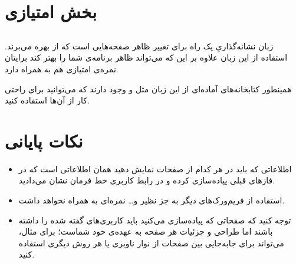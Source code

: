 \documentclass{utap}
\begin{document}
    
    
    
    
    
    \section{بخش امتیازی}
        \subsection{}
    زبان نشانه‌گذاریِ 
 یک راه برای تغییر ظاهر صفحه‌هایی است که از  بهره می‌برند. استفاده از این زبان علاوه بر این که می‌تواند ظاهر برنامه‌ی شما را بهتر کند برایتان نمره‌ی امتیازی هم به همراه دارد.
 
 همینطور کتابخانه‌های آماده‌ای از این زبان مثل
  و
  وجود دارند که می‌توانید برای راحتی کار از آن‌ها استفاده کنید. 
 
 
 
 
    \section{نکات پایانی}
        \begin{itemize}
            \item  اطلاعاتی که باید در هر کدام از صفحات نمایش دهید همان اطلاعاتی است که در فاز‌های قبلی پیاده‌سازی کرده‌ و در رابط کاربری خط فرمان نشان می‌دادید. 
            \item  
            استفاده از فریم‌ورک‌های دیگر به جز
                نظیر 
                و\dots{} نمره‌ای به همراه نخواهد داشت.
                
            \item 
            توجه کنید که صفحاتی که پیادەسازی می‌کنید باید کاربری‌های گفته شده را داشته باشند اما طراحی و جزئیات هر صفحه به عهدەی خود شماست؛ برای مثال، می‌تواند برای جابه‌جایی بین صفحات از نوار ناوبری
            یا هر روش دیگری استفاده کنید. 
        \end{itemize}
\end{document}
